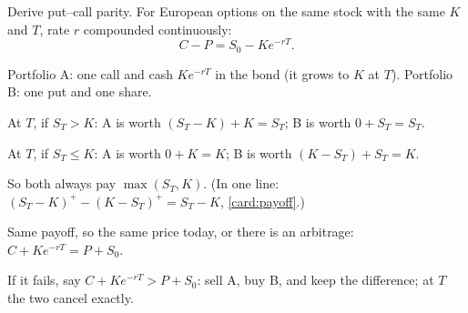 \begin{problem}[Q2(b)]
Derive put--call parity.
\cardsays For European options on the same stock with the same $K$ and $T$, rate $r$ compounded continuously:
\[
C-P=S_0-Ke^{-rT}.
\]
\working
\begin{steps}
\item Portfolio A: one call and cash $Ke^{-rT}$ in the bond (it grows to $K$ at $T$). Portfolio B: one put and one share.
\item At $T$, if $S_T>K$: A is worth $(S_T-K)+K=S_T$; B is worth $0+S_T=S_T$.
\item At $T$, if $S_T\le K$: A is worth $0+K=K$; B is worth $(K-S_T)+S_T=K$.
\item So both always pay $\max(S_T,K)$. (In one line: $(S_T-K)^+-(K-S_T)^+=S_T-K$, \cref{card:payoff}.)
\item Same payoff, so the same price today, or there is an arbitrage: $C+Ke^{-rT}=P+S_0$.
\item If it fails, say $C+Ke^{-rT}>P+S_0$: sell A, buy B, and keep the difference; at $T$ the two cancel exactly.
\end{steps}
\end{problem}

